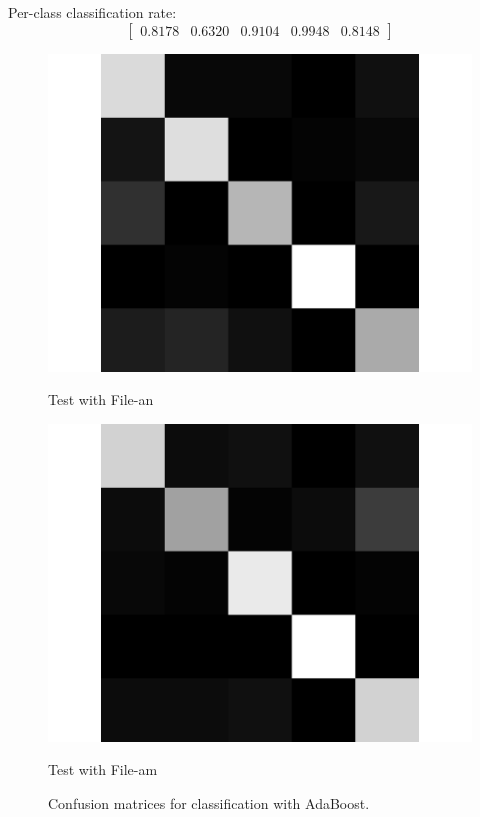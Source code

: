 \documentclass[letterpaper]{article}
\begin{document}
Per-class classification rate: 
$$\begin{bmatrix}0.8178 &   0.6320 &   0.9104  &  0.9948  &  0.8148\end{bmatrix}$$
\begin{figure}
\begin{minipage}{.45\linewidth}
   \includegraphics[width=\linewidth]{confusionmatrices/boost_train_am_test_an.png}
   \small\centerline{Test with File-an}\normalsize
   \end{minipage}
\begin{minipage}{.45\linewidth}
   \includegraphics[width=\linewidth]{confusionmatrices/boost_train_an_test_am.png}
   \small\centerline{Test with File-am}\normalsize
   \end{minipage}
   \caption{Confusion matrices for classification with AdaBoost.}
\end{figure}
\end{document}
